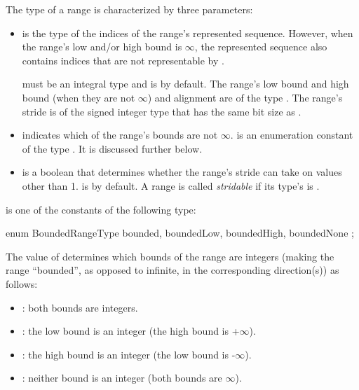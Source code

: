 The type of a range is characterized by three parameters:
\begin{itemize}

\item {} is the type of the indices of the range's
  represented sequence. However, when the range's low and/or high
  bound is $\infty$, the represented sequence also contains indices
  that are not representable by .

   must be an integral type and is  by default.
%
  The range's low bound and high bound (when they are not $\infty$)
  and alignment are of the type . The range's stride
  is of the signed integer type that has the same bit size as .

\item {} indicates which of the range's bounds are not $\infty$.
   is an enumeration constant of the type
  . It is discussed further below.

\item {} is a boolean that determines whether the range's stride
  can take on values other than 1.
   is  by default.
  A range is called \emph{stridable}
  if its type's  is .

\end{itemize}

 is one of the constants of the following type:

\begin{chapel}
enum BoundedRangeType { bounded, boundedLow, boundedHigh, boundedNone };
\end{chapel}

The value of  determines which bounds of the range
are integers (making the range ``bounded'', as opposed to infinite,
in the corresponding direction(s))
as follows:

\begin{itemize}

\item {}:
  both bounds are integers.

\item {}:
  the low bound is an integer (the high bound is +$\infty$).

\item {}:
  the high bound is an integer (the low bound is -$\infty$).

\item {}:
  neither bound is an integer (both bounds are $\infty$).

\end{itemize}

